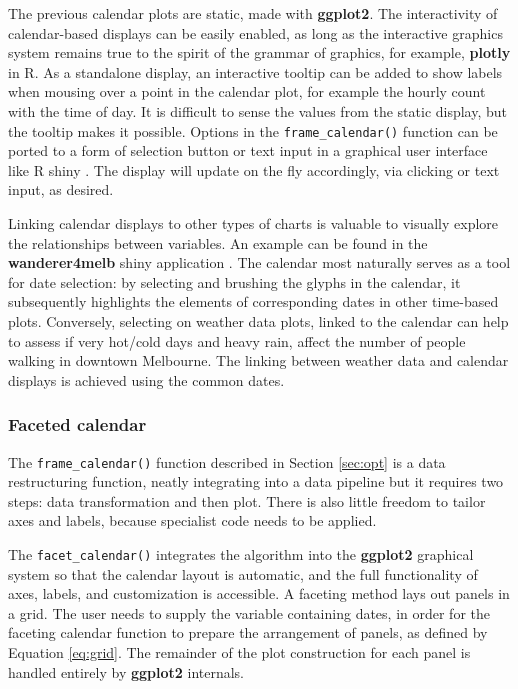 \documentclass[12pt]{article}
\begin{document}
The previous calendar plots are static, made with \textbf{ggplot2}. The interactivity of calendar-based displays can be easily enabled, as long as the interactive graphics system remains true to the spirit of the grammar of graphics, for example, \textbf{plotly} \citep{plotly} in R. As a standalone display, an interactive tooltip can be added to show labels when mousing over a point in the calendar plot, for example the hourly count with the time of day. It is difficult to sense the values from the static display, but the tooltip makes it possible. Options in the \texttt{frame\_calendar()} function can be ported to a form of selection button or text input in a graphical user interface like R shiny \citep{R-shiny}. The display will update on the fly accordingly, via clicking or text input, as desired.

Linking calendar displays to other types of charts is valuable to visually explore the relationships between variables. An example can be found in the \textbf{wanderer4melb} shiny application \citep{R-wanderer4melb}. The calendar most naturally serves as a tool for date selection: by selecting and brushing the glyphs in the calendar, it subsequently highlights the elements of corresponding dates in other time-based plots. Conversely, selecting on weather data plots, linked to the calendar can help to assess if very hot/cold days and heavy rain, affect the number of people walking in downtown Melbourne. The linking between weather data and calendar displays is achieved using the common dates.

\hypertarget{sec:facet-calendar}{%
\subsubsection{Faceted calendar}\label{sec:facet-calendar}}

The \texttt{frame\_calendar()} function described in Section \ref{sec:opt} is a data restructuring function, neatly integrating into a data pipeline but it requires two steps: data transformation and then plot. There is also little freedom to tailor axes and labels, because specialist code needs to be applied.

The \texttt{facet\_calendar()} integrates the algorithm into the \textbf{ggplot2} graphical system so that the calendar layout is automatic, and the full functionality of axes, labels, and customization is accessible. A faceting method lays out panels in a grid. The user needs to supply the variable containing dates, in order for the faceting calendar function to prepare the arrangement of panels, as defined by Equation \eqref{eq:grid}. The remainder of the plot construction for each panel is handled entirely by \textbf{ggplot2} internals.
\end{document}
